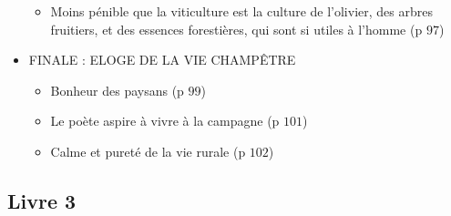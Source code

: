 \documentclass[a4paper, 11pt, hidelinks]{article}
\begin{document}
\begin{itemize}
\begin{itemize}
        \item Moins pénible que la viticulture est la culture de l'olivier, des arbres fruitiers, et des essences forestières, qui sont si utiles à l'homme (p $97$)
    \end{itemize}
    \item FINALE : ELOGE DE LA VIE CHAMPÊTRE \begin{itemize}
        \item Bonheur des paysans (p $99$)
        \item Le poète aspire à vivre à la campagne (p $101$)
        \item Calme et pureté de la vie rurale (p $102$)
    \end{itemize}
\end{itemize}



\subsection{Livre 3}
\end{document}
